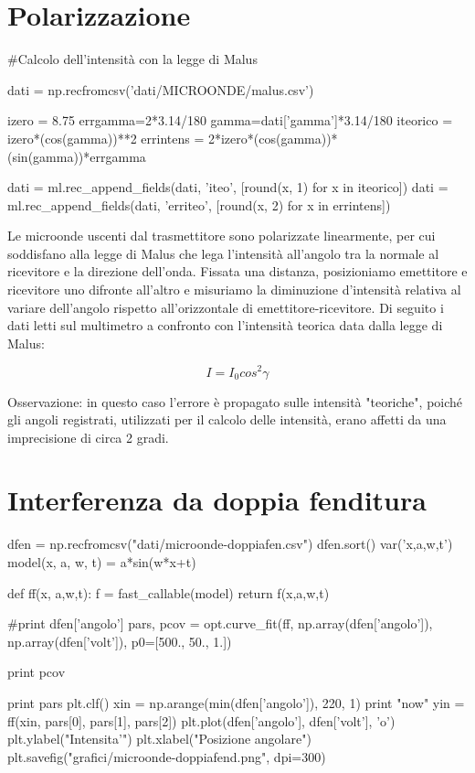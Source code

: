 
\section{Polarizzazione}

\begin{sagesilent}
#Calcolo dell'intensità con la legge di Malus

dati = np.recfromcsv('dati/MICROONDE/malus.csv')

izero = 8.75
errgamma=2*3.14/180
gamma=dati['gamma']*3.14/180
iteorico = izero*(cos(gamma))**2
errintens = 2*izero*(cos(gamma))*(sin(gamma))*errgamma

dati = ml.rec_append_fields(dati, 'iteo', [round(x, 1) for x in iteorico])
dati = ml.rec_append_fields(dati, 'erriteo', [round(x, 2) for x in errintens])

\end{sagesilent}


Le microonde uscenti dal trasmettitore sono polarizzate linearmente, per cui soddisfano alla legge di Malus che lega l'intensità all'angolo tra la normale al ricevitore e la direzione dell'onda. Fissata una distanza, posizioniamo emettitore e ricevitore uno difronte all'altro e misuriamo la diminuzione d'intensità relativa al variare dell'angolo rispetto all'orizzontale di emettitore-ricevitore. Di seguito i dati letti sul multimetro a confronto con l'intensità teorica data dalla legge di Malus:

\begin{equation}
I = I_{0} cos^2 \gamma
\end{equation}

\begin{center}
\end{center}

Osservazione: in questo caso l'errore è propagato sulle intensità "teoriche", poiché gli angoli registrati, utilizzati per il calcolo delle intensità, erano affetti da una imprecisione di circa 2 gradi.


\section{Interferenza da doppia fenditura}
\begin{sagesilent}
dfen = np.recfromcsv("dati/microonde-doppiafen.csv")
dfen.sort()
var('x,a,w,t')
model(x, a, w, t) = a*sin(w*x+t)

def ff(x, a,w,t):
  f = fast_callable(model)
  return f(x,a,w,t)

#print dfen['angolo']
pars, pcov = opt.curve_fit(ff, np.array(dfen['angolo']), np.array(dfen['volt']), p0=[500., 50., 1.])

print pcov

print pars
plt.clf()
xin = np.arange(min(dfen['angolo']), 220, 1)
print "now"
yin = ff(xin, pars[0], pars[1], pars[2])
plt.plot(dfen['angolo'], dfen['volt'], 'o')
plt.ylabel("Intensita'")
plt.xlabel("Posizione angolare")
plt.savefig("grafici/microonde-doppiafend.png", dpi=300)
\end{sagesilent}


